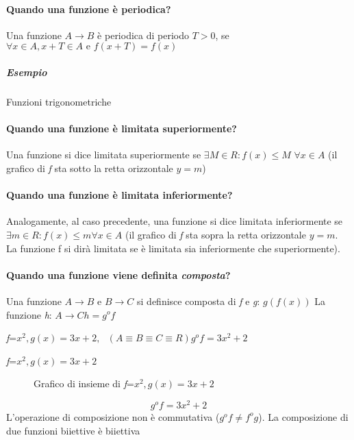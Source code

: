 \paragraph{Quando una funzione è periodica?}
Una funzione $A\to B$ è periodica di periodo $T>0$, se $\forall x \in A, x+T\in
A \text{ e } f(x+T)=f(x)$ 
\subparagraph{Esempio} Funzioni trigonometriche
\paragraph{Quando una funzione è limitata superiormente?}
Una funzione si dice limitata superiormente se $\exists M\in R: f(x)\leq M$
$\forall x \in A$ (il grafico di \textit{f} sta sotto la retta orizzontale $y=m$)
\paragraph{Quando una funzione è limitata inferiormente?}
Analogamente, al caso precedente, una funzione si dice limitata inferiormente
se $\exists m\in R:f(x)\leq m \forall x \in A$ (il grafico di \textit{f} sta
sopra la retta orizzontale $y=m$. La funzione f si dirà limitata se è limitata
sia inferiormente che superiormente).
\paragraph{Quando una funzione viene definita \textit{composta}?}
Una funzione $A\to B \text{ e } B\to C$ si definisce composta di \textit{f} e
\textit{g}: $g(f(x))$ La funzione \textit{h}: $A\to C h=g^of$
\begin{esempio} 
	\textit{f}=$x^2,g(x)=3x+2, \text{ } (A \equiv B \equiv C
	\equiv R) g^of=3x^2+2$
\end{esempio}
\begin{esempio}
	\textit{f}=$x^2,g(x)=3x+2$
\end{esempio}
\clearpage

\begin{figure}[!ht]
	\centering
	\caption{Grafico di insieme di \textit{f}=$x^2,g(x)=3x+2$}
\end{figure}
\begin{equation}
	\boxed{g^o f=3x^2+2}
\end{equation}
L'operazione di composizione non è commutativa ($g^of\neq f^og$). La
composizione di due funzioni biiettive è biiettiva

